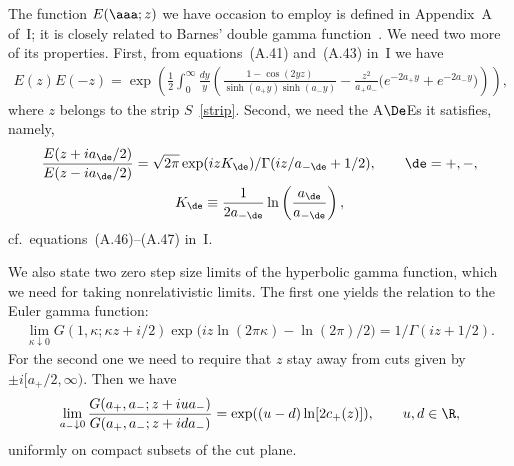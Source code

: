 \documentclass[pdftex]{sigma}
\numberwithin{equation}{section}
\begin{document}
The function $E(\aaa;z)$ we have occasion to employ is def\/ined in Appendix~A of~I; it is closely related to Barnes' double gamma function~\cite{barn}. We need two more of its properties. First, from equations~(A.41) and~(A.43) in~I we have
 \begin{gather}\label{EwT}
 E(z)E(-z)=\exp\left(\frac12\int_0^{\infty}\!\frac{dy}{y}\left(
 \frac{1-\cos(2yz)}{\sinh(a_{+}y)\sinh(a_{-}y)}-\frac{z^2}{a_+a_-}\big(e^{-2a_{+}y}+e^{-2a_{-}y}\big)\right)\right),\!\!\!
 \end{gather}
where $z$ belongs to the strip $S$~\eqref{strip}. Second, we need the A$\De$Es it satisf\/ies, namely,
\begin{gather}\label{Eades}
\frac{E(z+ia_{\de}/2)}{E(z-ia_{\de}/2)}=\sqrt{2\pi}\exp(izK_{\de})/\Gamma(iz/a_{-\de}+1/2),\qquad \de=+,-,
\\
K_{\de}\equiv \frac{1}{2a_{-\de}}\ln \left( \frac{a_{\de}}{a_{-\de}}\right),
\end{gather}
cf.~equations~(A.46)--(A.47) in~I.

We also state two zero step size limits of the hyperbolic gamma function, which we need for taking nonrelativistic limits. The f\/irst one yields the relation to the Euler gamma function:
\begin{gather}\label{GhGr}
\lim_{\kappa\downarrow 0}G(1,\kappa;
 \kappa z+i/2)\exp \big(iz\ln(2\pi\kappa)-\ln(2\pi)/2\big) = 1/\Gamma(iz+1/2).
\end{gather}
For the second one we need to require that $z$ stay away from  cuts given by $\pm i[a_+/2,\infty)$. Then we have
\begin{gather}\label{Gnr}
\lim_{a_{-}\downarrow 0}\frac{G(a_+, a_{-};z+iua_{-})}{G(a_+, a_{-};z+ida_{-})}
=\exp((u-d)\ln [2c_+(z)]),\qquad u,d\in\R,
\end{gather}
uniformly on compact subsets of the cut plane.
\end{document}
